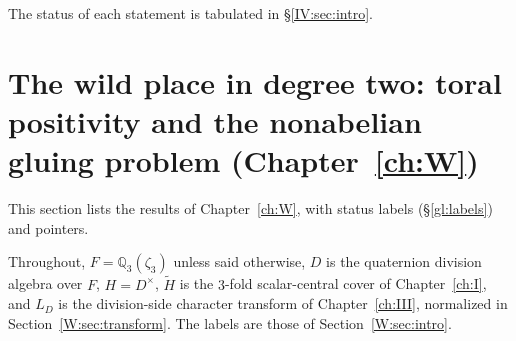 The status of each statement is tabulated in \S\ref{IV:sec:intro}.
\endgroup
\begingroup
\providecommand{\F}{}\renewcommand{\F}{F}
\providecommand{\Z}{}\renewcommand{\Z}{\mathbb Z}
\providecommand{\C}{}\renewcommand{\C}{\mathbb C}
\providecommand{\Q}{}\renewcommand{\Q}{\mathbb Q}
\providecommand{\Fq}{}\renewcommand{\Fq}{\mathbb F}
\providecommand{\Nm}{}\renewcommand{\Nm}{\operatorname N}
\providecommand{\Nrd}{}\renewcommand{\Nrd}{\operatorname{Nrd}}
\providecommand{\Trd}{}\renewcommand{\Trd}{\operatorname{Trd}}
\providecommand{\Tr}{}\renewcommand{\Tr}{\operatorname{Tr}}
\providecommand{\Irr}{}\renewcommand{\Irr}{\operatorname{Irr}}
\providecommand{\Ind}{}\renewcommand{\Ind}{\operatorname{Ind}}
\providecommand{\Ad}{}\renewcommand{\Ad}{\operatorname{Ad}}
\providecommand{\tH}{}\renewcommand{\tH}{\widetilde H}
\providecommand{\tZ}{}\renewcommand{\tZ}{\widetilde Z}
\providecommand{\tU}{}\renewcommand{\tU}{\widetilde U}
\providecommand{\tV}{}\renewcommand{\tV}{\widetilde V}
\providecommand{\tth}{}\renewcommand{\tth}{\widetilde\theta}
\providecommand{\Ocal}{}\renewcommand{\Ocal}{\mathcal O}
\providecommand{\Pfr}{}\renewcommand{\Pfr}{\mathfrak P}
\providecommand{\pfr}{}\renewcommand{\pfr}{\mathfrak p}
\providecommand{\Reg}{}\renewcommand{\Reg}{\operatorname{Reg}}
\providecommand{\Heis}{}\renewcommand{\Heis}{\mathrm{Heis}}
\providecommand{\Cubes}{}\renewcommand{\Cubes}{\mathrm{Cubes}}
\providecommand{\Good}{}\renewcommand{\Good}{\mathrm{Good}}
\providecommand{\Ptag}{}\renewcommand{\Ptag}{\textnormal{\textbf{(P)}}}
\providecommand{\Pctag}{}\renewcommand{\Pctag}{\textnormal{\textbf{(P$^{\mathrm c}$)}}}
\providecommand{\Etag}{}\renewcommand{\Etag}{\textnormal{\textbf{(E)}}}
\providecommand{\Otag}{}\renewcommand{\Otag}{\textnormal{\textbf{(O)}}}
\providecommand{\Ctag}{}\renewcommand{\Ctag}{\textnormal{\textbf{(C)}}}
\section{\texorpdfstring{The wild place in degree two: toral positivity and the nonabelian gluing problem (Chapter~\ref{ch:W})}{The wild place in degree two: toral positivity and the nonabelian gluing problem (Chapter 8)}}\label{W:sec:summary}
This section lists the results of Chapter~\ref{ch:W}, with status labels (\S\ref{gl:labels}) and pointers.

Throughout, $F=\Q_3(\zeta_3)$ unless said otherwise, $D$ is the
quaternion division algebra over $F$, $H=D^\times$, $\tH$ is the
$3$-fold scalar-central cover of Chapter~\ref{ch:I}, and $L_D$ is the division-side
character transform of Chapter~\ref{ch:III}, normalized in
Section~\ref{W:sec:transform}.  The labels are those of
Section~\ref{W:sec:intro}.

